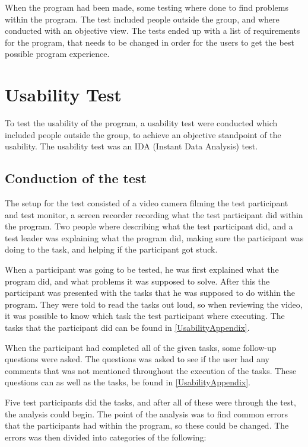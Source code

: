 When the program had been made, some testing where done to find problems within the program. The test included people outside the group, and where conducted with an objective view. The tests ended up with a list of requirements for the program, that needs to be changed in order for the users to get the best possible program experience.

\section{Usability Test}\label{UsabilityTestSection}

To test the usability of the program, a usability test were conducted which included people outside the group, to achieve an objective standpoint of the usability. The usability test was an IDA (Instant Data Analysis) test.

\subsection{Conduction of the test}

The setup for the test consisted of a video camera filming the test participant and test monitor, a screen recorder recording what the test participant did within the program. Two people where describing what the test participant did, and a test leader was explaining what the program did, making sure the participant was doing to the task, and helping if the participant got stuck.

When a participant was going to be tested, he was first explained what the program did, and what problems it was supposed to solve. After this the participant was presented with the tasks that he was supposed to do within the program. They were told to read the tasks out loud, so when reviewing the video, it was possible to know which task the test participant where executing. The tasks that the participant did can be found in \cref{UsabilityAppendix}.

When the participant had completed all of the given tasks, some follow-up questions were asked. The questions was asked to see if the user had any comments that was not mentioned throughout the execution of the tasks. These questions can as well as the tasks, be found in \cref{UsabilityAppendix}.

Five test participants did the tasks, and after all of these were through the test, the analysis could begin. The point of the analysis was to find common errors that the participants had within the program, so these could be changed. The errors was then divided into categories of the following:

